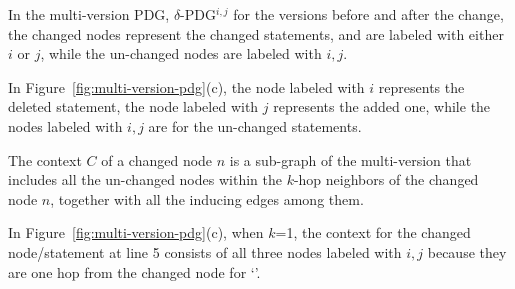 \begin{Definition}
In the multi-version PDG, $\delta$-PDG$^{i,j}$ for the versions before
and after the change, the changed nodes represent the changed
statements, and are labeled with either $i$ or $j$, while the
un-changed nodes are labeled with $i,j$.
\end{Definition}

In Figure~\ref{fig:multi-version-pdg}(c), the node labeled with $i$
represents the deleted statement, the node labeled with $j$ represents
the added one, while the nodes labeled with $i,j$ are for the un-changed
statements.


\begin{Definition}[Context]
The context $C$ of a changed node $n$ is a sub-graph of the
multi-version {\mvpdg} that includes all the un-changed nodes within
the $k$-hop neighbors of the changed node $n$, together with all the
inducing edges among them.
\end{Definition}

In Figure~\ref{fig:multi-version-pdg}(c), when $k$=1, the context for
the changed node/statement at line 5 consists of all three nodes
labeled with $i,j$ because they are one hop from the changed node for
`'.





